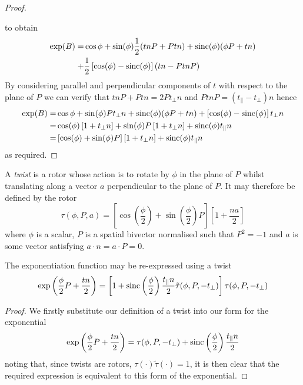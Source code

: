 \begin{proof}
\begin{centering}
\end{centering}

\noindent to obtain
\begin{align*}
\exp(B) = & 
  \cos \phi + \sin(\phi) \frac{1}{2} (tnP + Ptn) + \mathrm{sinc}(\phi) (\phi P + tn) \\
+ & \frac{1}{2} \left[ \cos(\phi) - \mathrm{sinc}(\phi) \right] (tn - PtnP)
\end{align*}
By considering parallel and perpendicular components of $t$ with
respect to the plane of $P$ we can verify that
$tnP + Ptn = 2 Pt_\perp n$ and $PtnP = (t_\parallel - t_\perp)n$ hence
\begin{align*}
\exp(B) = & 
  \cos \phi + \sin(\phi) P t_\perp n + \mathrm{sinc}(\phi) (\phi P + tn) + \left[ \cos(\phi) - \mathrm{sinc}(\phi) \right] t_\perp n \\
  = & \cos (\phi) \left[ 1 + t_\perp n \right] +
  \sin(\phi) P \left[ 1 + t_\perp n \right] + \mathrm{sinc}(\phi) t_\parallel n \\
  = & \left[ \cos(\phi) + \sin(\phi) P \right] \left[ 1 + t_\perp n \right] + \mathrm{sinc}(\phi) t_\parallel n 
\end{align*}
as required.
\end{proof}

\begin{definition}
A \emph{twist} is a rotor whose action is to rotate by $\phi$ in the 
plane of $P$ whilst translating along a vector $a$ perpendicular to
the plane of $P$. It may therefore be 
defined by the rotor 
\[
\tau(\phi, P, a) =
 \left[ \cos\left(\frac{\phi}{2}\right) +
   \sin\left(\frac{\phi}{2}\right)P
 \right]
 \left[
   1 + \frac{na}{2}
 \right]
\]
where $\phi$ is a scalar, $P$ is a spatial bivector normalised such that 
$P^2 = -1$ and $a$ is some vector satisfying $a \cdot n = a \cdot P = 0$.
\end{definition}

\begin{lemma}
The exponentiation function may be re-expressed using a twist
\[
\exp\left(\frac{\phi}{2}P + \frac{tn}{2}\right) =
\left[ 1 + \mathrm{sinc}\left(\frac{\phi}{2}\right)\frac{t_\parallel n}{2} \tilde{\tau}(\phi, P, - t_\perp) \right]
\tau(\phi, P, - t_\perp)
\]
\end{lemma}
\begin{proof}
We firstly substitute our definition of a twist into our form for the exponential
\begin{equation}
\exp\left(\frac{\phi}{2}P + \frac{tn}{2}\right) =
\tau(\phi, P, - t_\perp) + \mathrm{sinc}\left(\frac{\phi}{2}\right)\frac{t_\parallel n}{2}
\label{eqn:twistform}
\end{equation}
noting that, since twists are rotors, $\tau( \cdot ) \tilde{\tau}(\cdot) = 1$, it is
then clear that the required expression is equivalent to this form of the exponential.
\end{proof}

